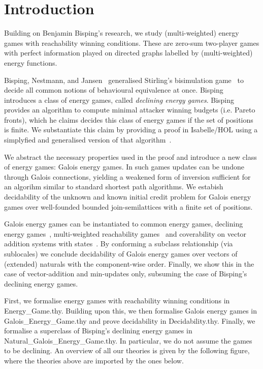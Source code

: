 \newpage
\section{Introduction}
 
\noindent
Building on Benjamin Bisping's research\cite{bens-algo}, 
we study (multi-weighted) energy games with reachability winning conditions. 
These are zero-sum two-player games with perfect information played on directed graphs 
labelled by (multi-weighted) energy functions. 

Bisping, Nestmann, and Jansen~\cite{bens-algo,bispingJansenNestmann,bispingNestmann} generalised 
Stirling's bisimulation game~\cite{stirling-bisim} to decide all common notions of behavioural equivalence at once.
Bisping~\cite{bens-algo} introduces a class of energy games, called \textit{declining energy games}.
Bisping provides an algorithm to compute minimal attacker winning budgets (i.e. Pareto fronts), 
which he claims decides this class of energy games if the set of positions is finite.
We substantiate this claim by providing a proof in Isabelle/HOL using a simplyfied and generalised version of that algorithm~\cite{Lemke2024}.

We abstract the necessary properties used in the proof and introduce a new class of energy games: Galois energy games. 
In such games updates can be undone through Galois connections, yielding a weakened form of inversion sufficient 
for an algorihm similar to standard shortest path algorithms. 
We estabish decidability of the unknown and known initial credit problem for Galois energy games 
over well-founded bounded join-semilattices with a finite set of positions. 

Galois energy games can be instantiated to common energy games, declining energy games~\cite{bens-algo}, multi-weighted reachability games~\cite{lexicograph} and  
coverability on vector addition systems with states~\cite{kunnemann2023coverability}. 
By conforming a subclass relationship (via sublocales) we conclude decidability of Galois energy games 
over vectors of (extended) naturals with the component-wise order. Finally, we show this in the case 
of vector-addition and min-updates only, subsuming the case of Bisping's declining energy games.

First, we formalise energy games with reachability winning conditions in Energy\_Game.thy. 
Building upon this, we then formalise Galois energy games in Galois\_Energy\_Game.thy and prove decidability in Decidability.thy.
Finally, we formalise a superclass of Bisping's declining energy games in Natural\_Galois\_Energy\_Game.thy. 
In particular, we do not assume the games to be declining.
An overview of all our theories is given by the following figure, where the theories above are imported by the ones below.


